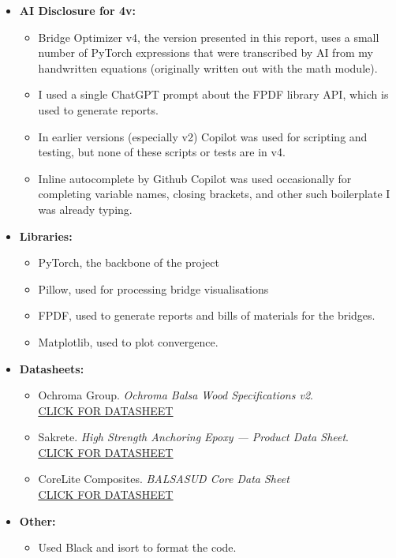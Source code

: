 \documentclass[11pt]{article}
\begin{document}
\begin{itemize}
  \item \textbf{AI Disclosure for 4v:} 
    \begin{itemize}
      \item Bridge Optimizer v4, the version presented in this report, uses a small number of PyTorch expressions that were transcribed by AI from my handwritten equations (originally written out with the math module). 
      \item I used a single ChatGPT prompt about the FPDF library API, which is used to generate reports.
      \item In earlier versions (especially v2) Copilot was used for scripting and testing, but none of these scripts or tests are in v4.
      \item Inline autocomplete by Github Copilot was used occasionally for completing variable names, closing brackets, and other such boilerplate I was already typing.
    \end{itemize}
  \item \textbf{Libraries:}
  \begin{itemize}
    \item PyTorch, the backbone of the project
    \item Pillow, used for processing bridge visualisations
    \item FPDF, used to generate reports and bills of materials for the bridges.
    \item Matplotlib, used to plot convergence.
  \end{itemize}
  \item \textbf{Datasheets:}
  \begin{itemize}
    \item Ochroma Group. \textit{Ochroma Balsa Wood Specifications v2}. \\
      \href{https://ochromagroup.com/wp-content/uploads/2025/01/SpecSheets/Ochroma-balsa-wood-specs-v2.pdf}{\uline{CLICK FOR DATASHEET}}
    \item Sakrete. \textit{High Strength Anchoring Epoxy --- Product Data Sheet}. \\
      \href{https://www.sakrete.com/wp-content/uploads/2021/07/High-Strength-Anchoring-Epoxy.pdf}{\uline{CLICK FOR DATASHEET}}
    \item CoreLite Composites. \textit{BALSASUD Core Data Sheet} \\
      \href{https://www.corelitecomposites.com/files/BALSASUD%20Core%20Data%20Sheet.pdf}{\uline{CLICK FOR DATASHEET}}
  \end{itemize}
  \item \textbf{Other:}
  \begin{itemize}
    \item Used Black and isort to format the code.
  \end{itemize}
\end{itemize}
\end{document}
